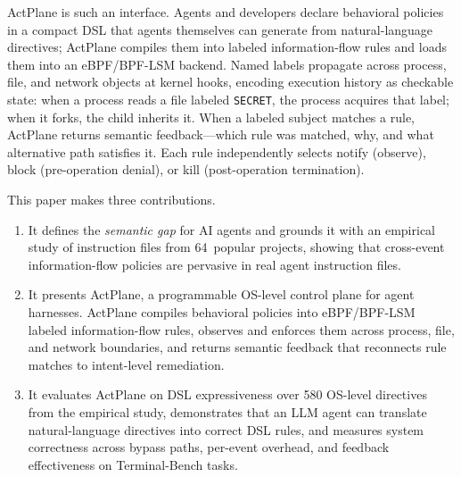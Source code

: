 ActPlane is such an interface. Agents and developers declare behavioral
policies in a compact DSL that agents themselves can generate from
natural-language directives; ActPlane compiles them into labeled
information-flow rules and loads them into an eBPF/BPF-LSM backend. Named
labels propagate across process, file, and network objects at kernel hooks,
encoding execution history as checkable state: when a process reads a file
labeled \texttt{SECRET}, the process acquires that label; when it forks, the
child inherits it. When a labeled subject matches a rule, ActPlane returns
semantic feedback---which rule was matched, why, and what alternative path
satisfies it. Each rule independently selects notify (observe), block
(pre-operation denial), or kill (post-operation termination).


This paper makes three contributions.

\begin{enumerate}
\item It defines the \emph{semantic gap} for AI agents and grounds it
with an empirical study of instruction files from 64~popular projects, showing
that cross-event information-flow policies are pervasive in real agent
instruction files.

\item It presents ActPlane, a programmable OS-level control plane for
agent harnesses. ActPlane compiles behavioral policies into eBPF/BPF-LSM
labeled information-flow rules, observes and enforces them across process,
file, and network boundaries, and returns semantic feedback that reconnects
rule matches to intent-level remediation.

\item It evaluates ActPlane on DSL expressiveness over 580 OS-level
directives from the empirical study, demonstrates that an LLM agent can
translate natural-language directives into correct DSL rules, and
measures system correctness across bypass paths, per-event overhead, and
feedback effectiveness on Terminal-Bench tasks.
\end{enumerate}
